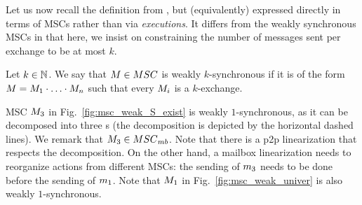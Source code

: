 \documentclass[a4paper,UKenglish,cleveref, autoref, thm-restate]{lipics-v2021}
\begin{document}
Let us now recall the definition
from \cite{DBLP:conf/cav/BouajjaniEJQ18,DBLP:conf/fossacs/GiustoLL20}, but (equivalently)
expressed directly in terms of MSCs rather than via \emph{executions}. It differs from the weakly synchronous MSCs in that here, we insist on constraining the number of messages sent per exchange to be at most $k$.

\begin{definition}\label{def:weaksync}
Let $k \in \mathbb{N}$.
We say that $\msc \in \MSCs$ is
weakly $k$-synchronous if it is of the form
$M = M_1 \cdot \ldots \cdot M_n$
such that every $M_i$ is a $k$-exchange.
\end{definition}

\noindent \begin{minipage}[c]{10.5cm}
\begin{example}
MSC $M_{3}$ in Fig.~\ref{fig:msc_weak_S_exist} is weakly $1$-synchronous, as it can be
decomposed  into three s (the decomposition is depicted by the
horizontal dashed lines). We remark that $\mscweakSexist \in
\mbMSCs$. Note that there is a p2p linearization that respects the decomposition.
On the other hand, a mailbox linearization needs to reorganize actions from different MSCs: the sending of
$m_3$ needs to be done before the sending of $m_1$. Note that $M_{1}$ in
Fig.~\ref{fig:msc_weak_univer} is also weakly $1$-synchronous.
\end{example}
\end{minipage}
\hfill
\begin{minipage}[c]{3cm}
\begin{center}

\label{fig:msc_weak_S_exist}

\end{center}
\end{minipage}
\end{document}
